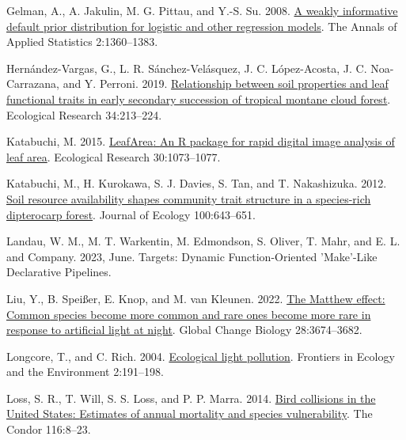 \documentclass[
  12pt,
  letterpaper,
  DIV=11,
  numbers=noendperiod]{scrartcl}
\newlength{\cslhangindent}
\newlength{\cslentryspacingunit} %
\newenvironment{CSLReferences}[2] %
 {%
  \setlength{\parindent}{0pt}
  \ifodd #1
  \let\oldpar\par
  \def\par{\hangindent=\cslhangindent\oldpar}
  \fi
  \setlength{\parskip}{#2\cslentryspacingunit}
 }%
 {}
\begin{document}
\begin{CSLReferences}{1}{0}
\leavevmode{}%
Gelman, A., A. Jakulin, M. G. Pittau, and Y.-S. Su. 2008.
\href{https://doi.org/10.1214/08-AOAS191}{A weakly informative default
prior distribution for logistic and other regression models}. The Annals
of Applied Statistics 2:1360--1383.

\leavevmode{}%
Hernández-Vargas, G., L. R. Sánchez-Velásquez, J. C. López-Acosta, J. C.
Noa-Carrazana, and Y. Perroni. 2019.
\href{https://doi.org/10.1111/1440-1703.1267}{Relationship between soil
properties and leaf functional traits in early secondary succession of
tropical montane cloud forest}. Ecological Research 34:213--224.

\leavevmode{}%
Katabuchi, M. 2015.
\href{https://doi.org/10.1007/s11284-015-1307-x}{{LeafArea}: {An R}
package for rapid digital image analysis of leaf area}. Ecological
Research 30:1073--1077.

\leavevmode{}%
Katabuchi, M., H. Kurokawa, S. J. Davies, S. Tan, and T. Nakashizuka.
2012. \href{https://doi.org/10.1111/j.1365-2745.2011.01937.x}{Soil
resource availability shapes community trait structure in a species-rich
dipterocarp forest}. Journal of Ecology 100:643--651.

\leavevmode{}%
Landau, W. M., M. T. Warkentin, M. Edmondson, S. Oliver, T. Mahr, and E.
L. and Company. 2023, June. Targets: {Dynamic Function-Oriented}
'{Make}'-{Like Declarative Pipelines}.

\leavevmode{}%
Liu, Y., B. Speißer, E. Knop, and M. van Kleunen. 2022.
\href{https://doi.org/10.1111/gcb.16126}{The {Matthew} effect: {Common}
species become more common and rare ones become more rare in response to
artificial light at night}. Global Change Biology 28:3674--3682.

\leavevmode{}%
Longcore, T., and C. Rich. 2004.
\href{https://doi.org/10.1890/1540-9295(2004)002\%5B0191:ELP\%5D2.0.CO;2}{Ecological
light pollution}. Frontiers in Ecology and the Environment 2:191--198.

\leavevmode{}%
Loss, S. R., T. Will, S. S. Loss, and P. P. Marra. 2014.
\href{https://doi.org/10.1650/CONDOR-13-090.1}{Bird
collisions in the {United States}: {Estimates} of annual mortality and
species vulnerability}. The Condor 116:8--23.


\end{CSLReferences}
\end{document}
